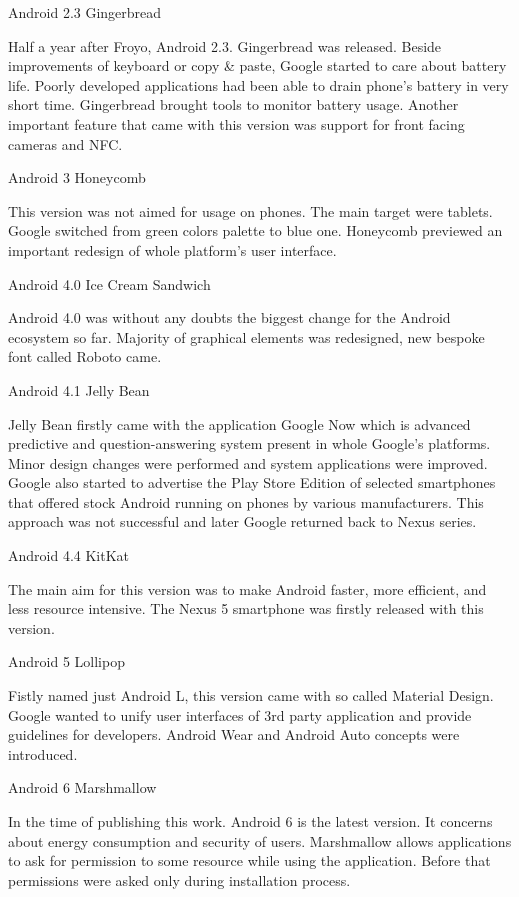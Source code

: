 \seccc Android 2.3 Gingerbread

Half a year after Froyo, Android 2.3. Gingerbread was released. Beside improvements of keyboard or copy \& paste, Google started to care about battery life. Poorly developed applications had been able to drain phone's battery in very short time. Gingerbread brought tools to monitor battery usage. Another important feature that came with this version was support for front facing cameras and NFC.

\seccc Android 3 Honeycomb

This version was not aimed for usage on phones. The main target were tablets. Google switched from green colors palette to blue one. Honeycomb previewed an important redesign of whole platform's user interface.

\seccc Android 4.0 Ice Cream Sandwich

Android 4.0 was without any doubts the biggest change for the Android ecosystem so far. Majority of graphical elements was redesigned, new bespoke font called Roboto came. 

\seccc Android 4.1 Jelly Bean

Jelly Bean firstly came with the application Google Now which is advanced predictive and question-answering system present in whole Google's platforms. Minor design changes were performed and system applications were improved. Google also started to advertise the Play Store Edition of selected smartphones that offered stock Android running on phones by various manufacturers. This approach was not successful and later Google returned back to Nexus series.

\seccc Android 4.4 KitKat

The main aim for this version was to make Android faster, more efficient, and less resource intensive. The Nexus 5 smartphone was firstly released with this version.


\seccc Android 5 Lollipop 

Fistly named just Android L, this version came with so called Material Design. Google wanted to unify user interfaces of 3rd party application and provide guidelines for developers. Android Wear and Android Auto concepts were introduced. 

\seccc Android 6 Marshmallow

In the time of publishing this work. Android 6 is the latest version. It concerns about energy consumption and security of users. Marshmallow allows applications to ask for permission to some resource while using the application. Before that permissions were asked only during installation process.

